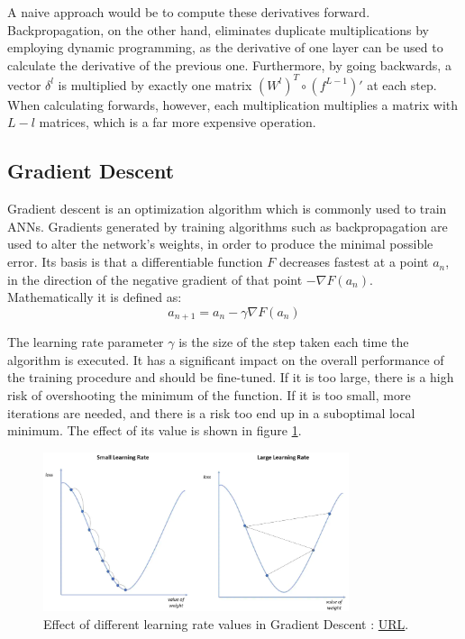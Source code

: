 A naive approach would be to compute these derivatives forward. Backpropagation, on the other hand, eliminates duplicate multiplications by employing dynamic programming, as the derivative of one layer can be used to calculate the derivative of the previous one. Furthermore, by going backwards, a vector \(\delta^l\) is multiplied by exactly one matrix \(\left( W^{l} \right)^T \circ \left( f^{L-1} \right)'\) at each step. When calculating forwards, however, each multiplication multiplies a matrix with \( L-l \) matrices, which is a far more expensive operation.

\subsection{Gradient Descent}
Gradient descent\cite{IBM_Gradient_Descent, gradient_descent_wiki} is an optimization algorithm which is commonly used to train ANNs. Gradients generated by training algorithms such as backpropagation are used to alter the network's weights, in order to produce the minimal possible error. Its basis is that a differentiable function \(F\) decreases fastest at a point \(a_n\), in the direction of the negative gradient of that point \(-\nabla F \left( a_n \right)\). Mathematically it is defined as:
\begin{equation}
a_{n+1} = a_n - \gamma \nabla F \left( a_n \right)
	\label{eqn:Gradient Descent}
\end{equation}

The learning rate parameter \(\gamma\) is the size of the step taken each time the algorithm is executed. It has a significant impact on the overall performance of the training procedure and should be fine-tuned. If it is too large, there is a high risk of overshooting the minimum of the function. If it is too small, more iterations are needed, and there is a risk too end up in a suboptimal local minimum. The effect of its value is shown in figure \ref{fig:Learning rate in Gradient Descent}.
\begin{figure}[H]
    \centering
        \includegraphics[width=0.8\textwidth]{Images/diagrams/learning_rate.png}
        \decoRule
        \caption[Effect of learning rate in Gradient Descent]{Effect of different learning rate values in Gradient Descent \cite{IBM_Gradient_Descent}: \href{https://www.ibm.com/cloud/learn/gradient-descent}{URL}.}
        \label{fig:Learning rate in Gradient Descent}
\end{figure}

